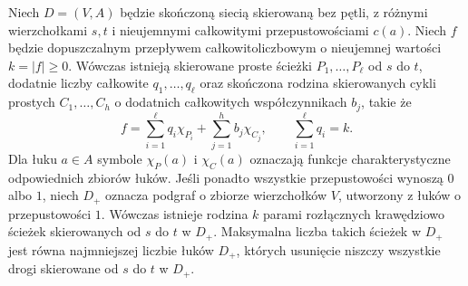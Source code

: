 \begin{twierdzenie}
\label{thm:tg-flow-integral-paths}
Niech $D=(V,A)$ będzie skończoną siecią skierowaną bez pętli,
z różnymi wierzchołkami $s,t$ i nieujemnymi całkowitymi
przepustowościami $c(a)$. Niech $f$ będzie dopuszczalnym
przepływem całkowitoliczbowym o nieujemnej wartości
$k=|f|\geq0$.
Wówczas istnieją skierowane proste ścieżki
$P_1,\ldots,P_\ell$ od $s$ do $t$,
dodatnie liczby całkowite $q_1,\ldots,q_\ell$
oraz skończona rodzina skierowanych cykli prostych
$C_1,\ldots,C_h$ o dodatnich całkowitych
współczynnikach $b_j$, takie że
\[
 f=\sum_{i=1}^{\ell}q_i\chi_{P_i}
   +\sum_{j=1}^{h}b_j\chi_{C_j},
 \qquad \sum_{i=1}^{\ell}q_i=k.
\]
Dla łuku $a\in A$ symbole $\chi_P(a)$ i $\chi_C(a)$
oznaczają funkcje charakterystyczne odpowiednich
zbiorów łuków. Jeśli ponadto wszystkie przepustowości
wynoszą $0$ albo $1$, niech $D_+$ oznacza podgraf
o zbiorze wierzchołków $V$, utworzony z łuków
o przepustowości $1$. Wówczas istnieje rodzina
$k$ parami rozłącznych krawędziowo ścieżek
skierowanych od $s$ do $t$ w $D_+$.
Maksymalna liczba takich ścieżek w $D_+$
jest równa najmniejszej liczbie łuków $D_+$,
których usunięcie niszczy wszystkie drogi skierowane
od $s$ do $t$ w $D_+$.
\end{twierdzenie}
